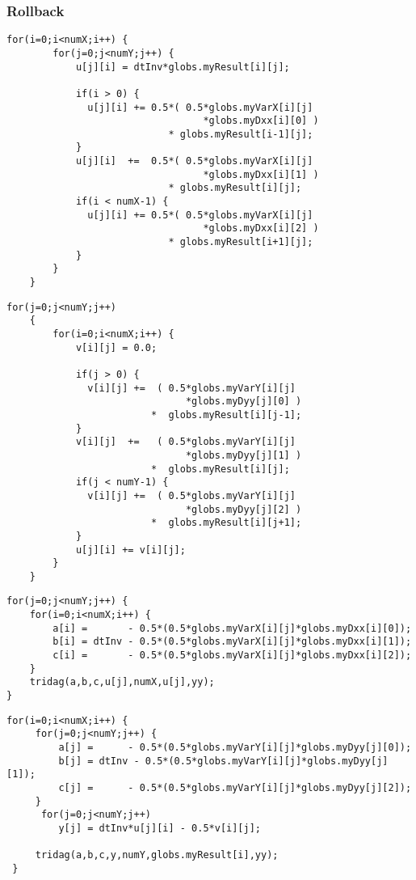 \subsubsection{Rollback}
\begin{lstlisting}[caption=Explicit x loop, label=exloop]
  for(i=0;i<numX;i++) {
        for(j=0;j<numY;j++) {
            u[j][i] = dtInv*globs.myResult[i][j];

            if(i > 0) {
              u[j][i] += 0.5*( 0.5*globs.myVarX[i][j]
                                  *globs.myDxx[i][0] )
                            * globs.myResult[i-1][j];
            }
            u[j][i]  +=  0.5*( 0.5*globs.myVarX[i][j]
                                  *globs.myDxx[i][1] )
                            * globs.myResult[i][j];
            if(i < numX-1) {
              u[j][i] += 0.5*( 0.5*globs.myVarX[i][j]
                                  *globs.myDxx[i][2] )
                            * globs.myResult[i+1][j];
            }
        }
    }
\end{lstlisting}
\begin{lstlisting}[caption=Explicit y loop, label=eyloop]
    for(j=0;j<numY;j++)
    {
        for(i=0;i<numX;i++) {
            v[i][j] = 0.0;

            if(j > 0) {
              v[i][j] +=  ( 0.5*globs.myVarY[i][j]
                               *globs.myDyy[j][0] )
                         *  globs.myResult[i][j-1];
            }
            v[i][j]  +=   ( 0.5*globs.myVarY[i][j]
                               *globs.myDyy[j][1] )
                         *  globs.myResult[i][j];
            if(j < numY-1) {
              v[i][j] +=  ( 0.5*globs.myVarY[i][j]
                               *globs.myDyy[j][2] )
                         *  globs.myResult[i][j+1];
            }
            u[j][i] += v[i][j];
        }
    }
\end{lstlisting}
\begin{lstlisting}
for(j=0;j<numY;j++) {
    for(i=0;i<numX;i++) {
        a[i] =		 - 0.5*(0.5*globs.myVarX[i][j]*globs.myDxx[i][0]);
        b[i] = dtInv - 0.5*(0.5*globs.myVarX[i][j]*globs.myDxx[i][1]);
        c[i] =		 - 0.5*(0.5*globs.myVarX[i][j]*globs.myDxx[i][2]);
    }
    tridag(a,b,c,u[j],numX,u[j],yy);
}
\end{lstlisting}
\begin{lstlisting}
for(i=0;i<numX;i++) {
     for(j=0;j<numY;j++) {
         a[j] =		 - 0.5*(0.5*globs.myVarY[i][j]*globs.myDyy[j][0]);
         b[j] = dtInv - 0.5*(0.5*globs.myVarY[i][j]*globs.myDyy[j][1]);
         c[j] =		 - 0.5*(0.5*globs.myVarY[i][j]*globs.myDyy[j][2]);
     }
      for(j=0;j<numY;j++)
         y[j] = dtInv*u[j][i] - 0.5*v[i][j];

     tridag(a,b,c,y,numY,globs.myResult[i],yy);
 }
\end{lstlisting}

